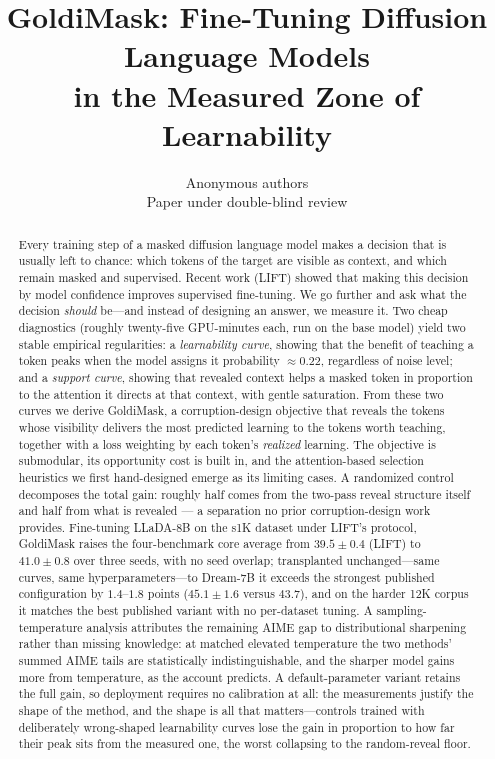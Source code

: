 \documentclass{article} %
\title{GoldiMask: Fine-Tuning Diffusion Language Models\\in the Measured Zone of Learnability}
\author{Anonymous authors\\
Paper under double-blind review}
\begin{document}
\maketitle

\begin{abstract}
Every training step of a masked diffusion language model makes a decision that is usually left to chance: which tokens of the target are visible as context, and which remain masked and supervised. Recent work (LIFT) showed that making this decision by model confidence improves supervised fine-tuning. We go further and ask what the decision \emph{should} be---and instead of designing an answer, we measure it. Two cheap diagnostics (roughly twenty-five GPU-minutes each, run on the base model) yield two stable empirical regularities: a \emph{learnability curve}, showing that the benefit of teaching a token peaks when the model assigns it probability $\approx 0.22$, regardless of noise level; and a \emph{support curve}, showing that revealed context helps a masked token in proportion to the attention it directs at that context, with gentle saturation. From these two curves we derive GoldiMask, a corruption-design objective that reveals the tokens whose visibility delivers the most predicted learning to the tokens worth teaching, together with a loss weighting by each token's \emph{realized} learning. The objective is submodular, its opportunity cost is built in, and the attention-based selection heuristics we first hand-designed emerge as its limiting cases. A randomized control decomposes the total gain: roughly half comes from the two-pass reveal structure itself and half from what is revealed --- a separation no prior corruption-design work provides. Fine-tuning LLaDA-8B on the s1K dataset under LIFT's protocol, GoldiMask raises the four-benchmark core average from $39.5 \pm 0.4$ (LIFT) to $41.0 \pm 0.8$ over three seeds, with no seed overlap; transplanted unchanged---same curves, same hyperparameters---to Dream-7B it exceeds the strongest published configuration by $1.4$--$1.8$ points ($45.1 \pm 1.6$ versus $43.7$), and on the harder 12K corpus it matches the best published variant with no per-dataset tuning. A sampling-temperature analysis attributes the remaining AIME gap to distributional sharpening rather than missing knowledge: at matched elevated temperature the two methods' summed AIME tails are statistically indistinguishable, and the sharper model gains more from temperature, as the account predicts. A default-parameter variant retains the full gain, so deployment requires no calibration at all: the measurements justify the shape of the method, and the shape is all that matters---controls trained with deliberately wrong-shaped learnability curves lose the gain in proportion to how far their peak sits from the measured one, the worst collapsing to the random-reveal floor.
\end{abstract}
\end{document}
